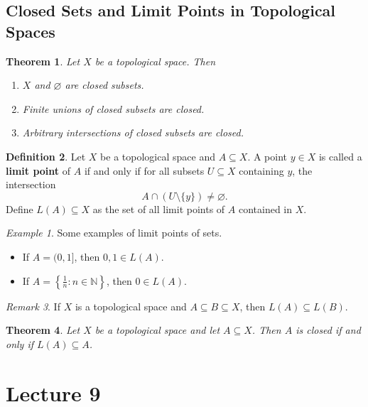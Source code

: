 \documentclass[ 12pt ]{article}
\newcounter{lecture_num}
\theoremstyle{plain}
\theoremstyle{plain}
\newtheorem{theorem}{Theorem}[lecture_num]
\theoremstyle{definition}
\newtheorem{definition}[theorem]{Definition}
\theoremstyle{remark}
\newtheorem{remark}[theorem]{Remark}
\newtheorem*{example*}{Example}
\begin{document}
\subsection*{Closed Sets and Limit Points in Topological Spaces}

\begin{theorem}
	Let $X$ be a topological space. Then
	\begin{enumerate}
		\item $X$ and $\varnothing$ are closed subsets.
		\item Finite unions of closed subsets are closed.
		\item Arbitrary intersections of closed subsets are closed.
	\end{enumerate}
\end{theorem}

\begin{definition}
	Let $X$ be a topological space and $A \subseteq X$. A point $y \in X$ is called a \textbf{limit point} of $A$ if and only if for all subsets $U \subseteq X$ containing $y$, the
	intersection $$A \cap (U \setminus \{ y \}) \neq \varnothing.$$ Define $L(A) \subseteq X$ as the set of all limit points of $A$ contained in $X$.
\end{definition}

\begin{example*}
	Some examples of limit points of sets.
	\begin{itemize}
		\item If $A = (0, 1]$, then $0, 1 \in L(A)$.
		\item If $A = \left \{ \frac{1}{n} : n \in \mathbb{N} \right \}$, then $0 \in L(A)$.
	\end{itemize}
\end{example*}

\begin{remark}
	If $X$ is a topological space and $A \subseteq B \subseteq X$, then $L(A) \subseteq L(B)$.
\end{remark}

\begin{theorem}
	Let $X$ be a topological space and let $A \subseteq X$. Then $A$ is closed if and only if $L(A) \subseteq A$.
\end{theorem}


\setcounter{lecture_num}{9}
\setcounter{theorem}{0}
\section*{Lecture 9}
\end{document}
